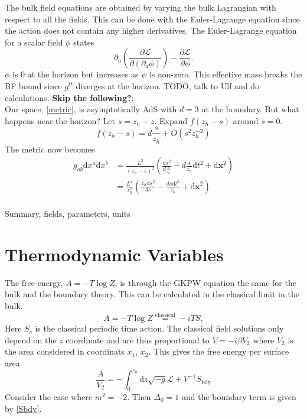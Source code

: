 \documentclass[12pt]{report}
\renewcommand{\d}{\ensuremath{\mathrm{d}}}
\renewcommand{\L}{\ensuremath{\mathcal{L}}}
\renewcommand{\i}{\ensuremath{i}}
\begin{document}
The bulk field equations are obtained by varying the bulk Lagrangian with respect to all the fields. This can be done with the Euler-Lagrange equation since the action does not contain any higher derivatives. The Euler-Lagrange equation for a scalar field $\phi$ states
\begin{equation}
 \partial_a\left(\frac{\partial\mathcal{L}}{\partial(\partial_a\phi)}\right)-\frac{\partial\mathcal{L}}{\partial\phi}.
\end{equation}
$\phi$ is 0 at the horizon but increases as $\psi$ is non-zero. This effective mass breaks the BF bound since $g^{tt}$ diverges at the horizon. TODO, talk to Ulf and do calculations.
{\bf Skip the following?}:\\
Our space, \eqref{metric}, is asymptotically AdS with $d=3$ at the boundary. But what happens near the horizon? Let $s=z_h-z$. Expand $f(z_h-s)$ around $s=0$.
\begin{equation}
 f(z_h-s)%
=d\frac{s}{z_h}+O(s^2z_h^{-2})
\end{equation}
The metric now becomes
\begin{equation}
\begin{split}
 g_{ab}\d x^a\d x^b&=\frac{L^2}{(z_h-s)^2}\left(\frac{\d s^2}{d\frac{s}{z_h}}-d\frac{s}{z_h}\d t^2+\d \mathbf{x}^2\right)\\
&=\frac{L^2}{z_h^2}\left(\frac{z_h\d s^2}{ds}-\frac{ds\d t^2}{z_h}+\d \mathbf{x}^2\right)
\end{split}
\end{equation}
\\
Summary, fields, parameters, units
\section{Thermodynamic Variables}

The free energy, $A=-T\log{Z}$, is through the GKPW equation the same for the bulk and the boundary theory. This can be calculated in the classical limit in the bulk.
\begin{equation}
 A=-T\log{Z}\stackrel{\mathrm{classical}}{=}-\i T S_c
\end{equation}
Here $S_c$ is the classical periodic time action. The classical field solutions only depend on the $z$ coordinate and are thus proportional to $V=-\i\beta V_2$ where $V_2$ is the area considered in coordinats $x_1$, $x_2$. This gives the free energy per surface area
\begin{equation}
 \frac{A}{V_2}=-\int_0^{z_h}\d z \sqrt{-g}\L+V^{-1}S_{\mathrm{bdy}}
\end{equation}
Consider the case where $m^2=-2$. Then $\Delta_0=1$ and the boundary term is given by \eqref{Sbdy}.\\
\end{document}
